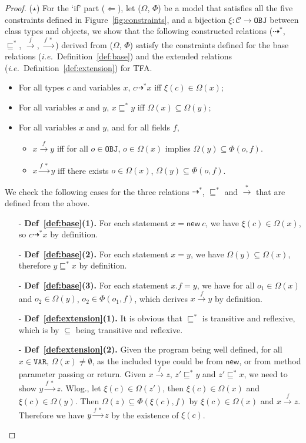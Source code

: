 \documentclass{fac}
\newcommand\ie{\textit{i.e.\ }}
\newcommand{\keyword}[1]{\mathsf{#1}}
\newcommand{\kwnew}[0]{\keyword{new}}
\newcommand\Var{\mathtt{VAR}}
\newcommand\Obj{\mathtt{OBJ}}
\newcommand{\VPT}{\Omega}
\newcommand{\HPT}{\Phi}
\newcommand{\Class}{\mathcal{C}}
\newcommand{\less}{\sqsubseteq}
\newcommand{\tflow}{\dashrightarrow}
\newcommand{\hflow}{\longrightarrow}
\newcommand{\lhflow}[1]{\stackrel{#1}{\hflow}}
\begin{document}
\begin{proof}
($\star$) For the `if' part ($\Leftarrow$), let ($\VPT$, $\HPT$) be a model that satisfies all the five constraints defined in Figure~\ref{fig:constraints}, and a bijection $\xi:\Class\rightarrow\Obj$ between class types and objects, we show that the following constructed relations ($\tflow^*$, $\less^*$, $\lhflow{f}$, $\lhflow{f\ *}$) derived from ($\VPT$, $\HPT$) satisfy the constraints defined for the base relations (\ie Definition~\ref{def:base}) and the extended relations (\ie Definition~\ref{def:extension}) for TFA.
\begin{itemize}
  \item For all types $c$ and variables $x$, $c\tflow^* x$ iff $\xi(c)\in\VPT(x)$;
  \item For all variables $x$ and $y$, $x\less^*y$ iff $\VPT(x)\subseteq\VPT(y)$;
  \item For all variables $x$ and $y$, and for all fields $f$, \begin{itemize}
    \item $x\lhflow{f}y$ iff for all $o\in\Obj$, $o\in\VPT(x)$ implies $\VPT(y)\subseteq\HPT(o,f)$.
    \item $x\lhflow{f\ *}y$ iff there exists $o\in\VPT(x)$, $\VPT(y)\subseteq\HPT(o,f)$.
  \end{itemize}
\end{itemize}
We check the following cases for the three relations $\tflow^*$, $\less^*$ and $\lhflow{*}$ that are defined from the above.
\begin{itemize}
\item[-] \textbf{Def~\ref{def:base}(1).} For each statement $x = \kwnew\ c$, we have $\xi(c)\in\VPT(x)$, so $c\tflow^* x$ by definition.
\item[-] \textbf{Def~\ref{def:base}(2).} For each statement $x = y$, we have $\VPT(y)\subseteq\VPT(x)$, therefore $y\less^*x$ by definition.
\item[-] \textbf{Def~\ref{def:base}(3).} For each statement $x.f = y$, we have for all $o_1\in\VPT(x)$ and $o_2\in\VPT(y)$, $o_2\in\HPT(o_1,f)$, which derives $x\lhflow{f}y$ by definition.
\item[-] \textbf{Def~\ref{def:extension}(1).} It is obvious that $\less^*$ is transitive and reflexive, which is by $\subseteq$ being transitive and reflexive.
\item[-] \textbf{Def~\ref{def:extension}(2).} Given the program being well defined, for all $x\in\Var$, $\VPT(x)\neq\emptyset$, as the included type could be from $\kwnew$, or from method parameter passing or return. %
Given $x\lhflow{f}z$, $z'\less^*y$ and $z'\less^*x$, we need to show $y\lhflow{f\ *}z$.
Wlog., let $\xi(c)\in\VPT(z')$, then $\xi(c)\in\VPT(x)$ and $\xi(c)\in\VPT(y)$. Then $\VPT(z)\subseteq\HPT(\xi(c),f)$ by $\xi(c)\in\VPT(x)$ and $x\lhflow{f}z$. Therefore we have $y\lhflow{f\ *}z$ by the existence of $\xi(c)$.


\end{itemize}
\end{proof}
\end{document}
